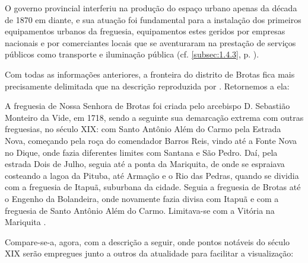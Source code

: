 O governo provincial interferiu na produção do espaço urbano apenas da década de 1870 em diante, e sua atuação foi fundamental para a instalação dos primeiros equipamentos urbanos da freguesia, equipamentos estes geridos por empresas nacionais e por comerciantes locais que se aventuraram na prestação de serviços públicos como transporte e iluminação pública (cf. \autoref{subsec:1.4.3}, p. \pageref{subsec:1.4.3}).

Com todas as informações anteriores, a fronteira do distrito de Brotas fica mais precisamente delimitada que na descrição reproduzida por . Retornemos a ela:

\begin{citacao}
A freguesia de Nossa Senhora de Brotas foi criada pelo arcebispo D. Sebastião Monteiro da Vide, em 1718, sendo a seguinte sua demarcação extrema com outras freguesias, no século XIX: com Santo Antônio Além do Carmo pela Estrada Nova, começando pela roça do comendador Barros Reis, vindo até a Fonte Nova no Dique, onde fazia diferentes limites com Santana e São Pedro. Daí, pela estrada Dois de Julho, seguia até a ponta da Mariquita, de onde se espraiava costeando a lagoa da Pituba, até Armação e o Rio das Pedras, quando se dividia com a freguesia de Itapuã, suburbana da cidade. Seguia a freguesia de Brotas até o Engenho da Bolandeira, onde novamente fazia divisa com Itapuã e com a freguesia de Santo Antônio Além do Carmo. Limitava-se com a Vitória na Mariquita \cite[p.~58]{NASCIMENTO2007}.
\end{citacao}

Compare-se-a, agora, com a descrição a seguir, onde pontos notáveis do século XIX serão empregues junto a outros da atualidade para facilitar a visualização:

